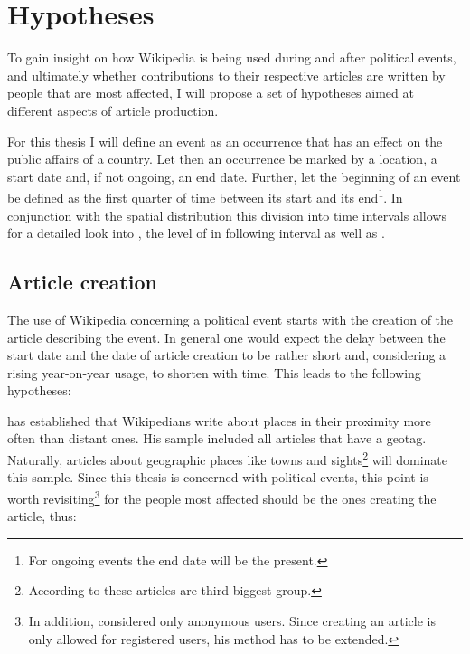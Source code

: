 \chapter{Hypotheses}\label{ch:hypotheses}

To gain insight on how Wikipedia is being used during and after political events, and ultimately whether contributions to their respective articles are written by people that are most affected, I will propose a set of hypotheses aimed at different aspects of article production.

For this thesis I will define an event as an occurrence that has an effect on the public affairs of a country.
Let then an occurrence be marked by a location, a start date and, if not ongoing, an end date. 
Further, let the beginning of an event be defined as the first quarter of time between its start and its end\footnote{For ongoing events the end date will be the present.}.
In conjunction with the spatial distribution this division into time intervals allows for a detailed look into , the level of   in following interval as well as  .

\section{Article creation}\label{sec:articlecreation}

The use of Wikipedia concerning a political event starts with the creation of the article describing the event.
In general one would expect the delay between the start date and the date of article creation to be rather short and, considering a rising year-on-year usage\cite{wikipv}, to shorten with time.
This leads to the following hypotheses:



\textcite[57]{hardy2011volunteered} has established that Wikipedians write about places in their proximity more often than distant ones.
His sample included all articles that have a geotag.
Naturally, articles about geographic places like towns and sights\footnote{According to \textcite{kittur2009s} these articles are third biggest group.} will dominate this sample.
Since this thesis is concerned with political events, this point is worth revisiting\footnote{In addition, \textcite[61]{hardy2011volunteered} considered only anonymous users. Since creating an article is only allowed for registered users, his method has to be extended.} for the people most affected should be the ones creating the article, thus:

